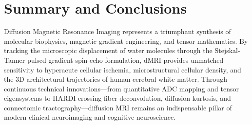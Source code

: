 \documentclass[11pt,a4paper]{article}
\begin{document}
\section{Summary and Conclusions}

Diffusion Magnetic Resonance Imaging represents a triumphant synthesis of molecular biophysics, magnetic gradient engineering, and tensor mathematics. By tracking the microscopic displacement of water molecules through the Stejskal-Tanner pulsed gradient spin-echo formulation, dMRI provides unmatched sensitivity to hyperacute cellular ischemia, microstructural cellular density, and the 3D architectural trajectories of human cerebral white matter. Through continuous technical innovations—from quantitative ADC mapping and tensor eigensystems to HARDI crossing-fiber deconvolution, diffusion kurtosis, and connectomic tractography—diffusion MRI remains an indispensable pillar of modern clinical neuroimaging and cognitive neuroscience.
\end{document}
